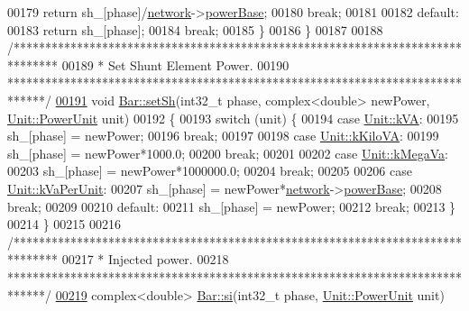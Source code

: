 \begin{DoxyCode}
00179     \textcolor{keywordflow}{return} sh\_[phase]/\hyperlink{class_bar_a80025f13884750add58cc61b318357ff}{network}->\hyperlink{group___graphics_ga74bb7aa495d422f1f092acdf958df989}{powerBase};
00180     \textcolor{keywordflow}{break};
00181 
00182   \textcolor{keywordflow}{default}:
00183     \textcolor{keywordflow}{return} sh\_[phase];
00184     \textcolor{keywordflow}{break};
00185   \}
00186 \}
00187 
00188 \textcolor{comment}{/*******************************************************************************}
00189 \textcolor{comment}{ * Set Shunt Element Power.}
00190 \textcolor{comment}{ ******************************************************************************/}
\hypertarget{bar_8cpp_source_l00191}{}\hyperlink{group___models_ga207abd3d0649a488e3c44cf2a501ed23}{00191} \textcolor{keywordtype}{void} \hyperlink{group___models_ga207abd3d0649a488e3c44cf2a501ed23}{Bar::setSh}(int32\_t phase, complex<double> newPower, 
      \hyperlink{class_unit_ace265ae255370ccacfd5370337572c3b}{Unit::PowerUnit} unit)
00192 \{
00193   \textcolor{keywordflow}{switch} (unit) \{
00194   \textcolor{keywordflow}{case} \hyperlink{class_unit_ace265ae255370ccacfd5370337572c3ba72b181a842ae2759488a2fa1410d3696}{Unit::kVA}:
00195     sh\_[phase] = newPower;
00196     \textcolor{keywordflow}{break};
00197 
00198   \textcolor{keywordflow}{case} \hyperlink{class_unit_ace265ae255370ccacfd5370337572c3bac9e5154522fbb810d7aed75c3ff47cb2}{Unit::kKiloVA}:
00199     sh\_[phase] = newPower*1000.0;
00200     \textcolor{keywordflow}{break};
00201 
00202   \textcolor{keywordflow}{case} \hyperlink{class_unit_ace265ae255370ccacfd5370337572c3ba6039da0ed20f8bee64305bab8bdec365}{Unit::kMegaVa}:
00203     sh\_[phase] = newPower*1000000.0;
00204     \textcolor{keywordflow}{break};
00205 
00206   \textcolor{keywordflow}{case} \hyperlink{class_unit_ace265ae255370ccacfd5370337572c3bae056e80d620a87c61a44c359e6b05cc1}{Unit::kVaPerUnit}:
00207     sh\_[phase] = newPower*\hyperlink{class_bar_a80025f13884750add58cc61b318357ff}{network}->\hyperlink{group___graphics_ga74bb7aa495d422f1f092acdf958df989}{powerBase};
00208     \textcolor{keywordflow}{break};
00209 
00210   \textcolor{keywordflow}{default}:
00211     sh\_[phase] = newPower;
00212     \textcolor{keywordflow}{break};
00213   \}
00214 \}
00215 
00216 \textcolor{comment}{/*******************************************************************************}
00217 \textcolor{comment}{ * Injected power.}
00218 \textcolor{comment}{ ******************************************************************************/}
\hypertarget{bar_8cpp_source_l00219}{}\hyperlink{group___models_ga02bbc279f1e133f66b12ee21e7bebcd8}{00219} complex<double> \hyperlink{group___models_ga02bbc279f1e133f66b12ee21e7bebcd8}{Bar::si}(int32\_t phase, \hyperlink{class_unit_ace265ae255370ccacfd5370337572c3b}{Unit::PowerUnit} unit)

\end{DoxyCode}
